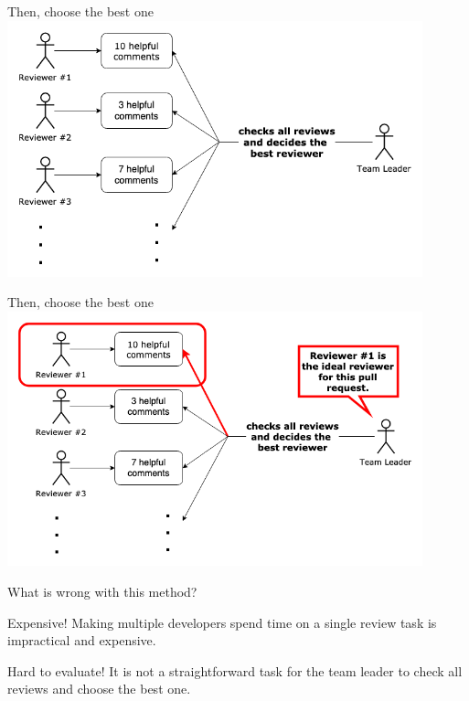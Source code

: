 \documentclass{beamer}
\begin{document}
    \begin{frame}{Then, choose the best one}
        \centering\includegraphics[width=0.9\textwidth]{img/multiple_review_2.png}
    \end{frame}

    \begin{frame}{Then, choose the best one}
        \centering\includegraphics[width=0.9\textwidth]{img/multiple_review_3.png}
    \end{frame}
    
    \begin{frame}{What is wrong with this method?}
    \begin{alertblock}{Expensive!}
        Making multiple developers spend time on a single review task is impractical and expensive.
    \end{alertblock}
    \pause
    \begin{alertblock}{Hard to evaluate!}
        It is not a straightforward task for the team leader to check all reviews and choose the best one.
    \end{alertblock} 
    \end{frame}
    
\end{document}
